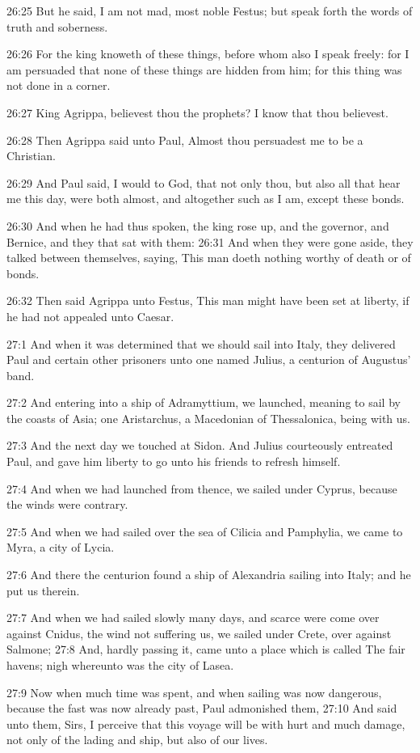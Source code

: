 26:25 But he said, I am not mad, most noble Festus; but speak forth the words of truth and soberness.

26:26 For the king knoweth of these things, before whom also I speak freely: for I am persuaded that none of these things are hidden from him; for this thing was not done in a corner.

26:27 King Agrippa, believest thou the prophets? I know that thou believest.

26:28 Then Agrippa said unto Paul, Almost thou persuadest me to be a Christian.

26:29 And Paul said, I would to God, that not only thou, but also all that hear me this day, were both almost, and altogether such as I am, except these bonds.

26:30 And when he had thus spoken, the king rose up, and the governor, and Bernice, and they that sat with them: 26:31 And when they were gone aside, they talked between themselves, saying, This man doeth nothing worthy of death or of bonds.

26:32 Then said Agrippa unto Festus, This man might have been set at liberty, if he had not appealed unto Caesar.

27:1 And when it was determined that we should sail into Italy, they delivered Paul and certain other prisoners unto one named Julius, a centurion of Augustus' band.

27:2 And entering into a ship of Adramyttium, we launched, meaning to sail by the coasts of Asia; one Aristarchus, a Macedonian of Thessalonica, being with us.

27:3 And the next day we touched at Sidon. And Julius courteously entreated Paul, and gave him liberty to go unto his friends to refresh himself.

27:4 And when we had launched from thence, we sailed under Cyprus, because the winds were contrary.

27:5 And when we had sailed over the sea of Cilicia and Pamphylia, we came to Myra, a city of Lycia.

27:6 And there the centurion found a ship of Alexandria sailing into Italy; and he put us therein.

27:7 And when we had sailed slowly many days, and scarce were come over against Cnidus, the wind not suffering us, we sailed under Crete, over against Salmone; 27:8 And, hardly passing it, came unto a place which is called The fair havens; nigh whereunto was the city of Lasea.

27:9 Now when much time was spent, and when sailing was now dangerous, because the fast was now already past, Paul admonished them, 27:10 And said unto them, Sirs, I perceive that this voyage will be with hurt and much damage, not only of the lading and ship, but also of our lives.

